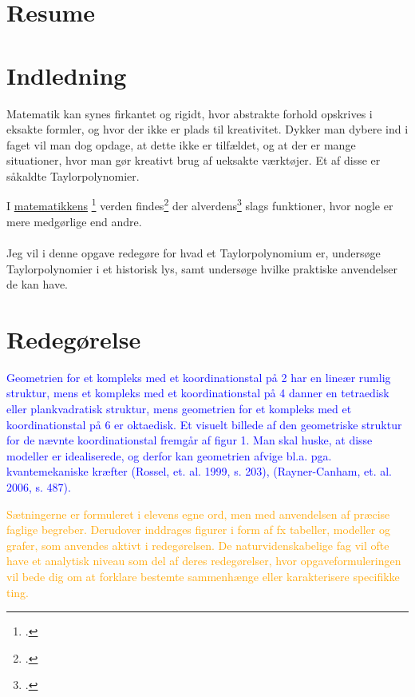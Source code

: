 \documentclass[12pt, a4paper]{article}
\begin{document}
\section*{Resume} %
\blindtext[1-2]
\tableofcontents
\newpage



\section{Indledning} %
Matematik kan synes firkantet og rigidt, hvor abstrakte forhold opskrives i eksakte formler, og hvor der ikke er plads til kreativitet. 
Dykker man dybere ind i faget vil man dog opdage, at dette ikke er tilfældet, og at der er mange situationer, hvor man gør kreativt brug af ueksakte værktøjer. Et af disse er såkaldte Taylorpolynomier.


I \underline{matematikkens} \footcite[s. 23]{alsholm1} verden findes\footcite[s. 22]{alsholm1} der alverdens\footcite{calculuswithanalyticgeometry} slags funktioner, hvor nogle er mere medgørlige end andre.\\
\\
Jeg vil i denne opgave redegøre for hvad et Taylorpolynomium er, undersøge Taylorpolynomier i et historisk lys, samt undersøge hvilke praktiske anvendelser de kan have.

\section{Redegørelse} %
\textcolor{blue}{Geometrien for et kompleks med et koordinationstal på 2 har en lineær rumlig struktur, mens et kompleks med et koordinationstal på 4 danner en tetraedisk eller plankvadratisk struktur, mens geometrien for et kompleks med et koordinationstal på 6 er oktaedisk. Et visuelt billede af den geometriske struktur for de nævnte koordinationstal fremgår af figur 1. Man skal huske, at disse modeller er idealiserede, og derfor kan geometrien afvige bl.a. pga. kvantemekaniske kræfter (Rossel, et. al. 1999, s. 203), (Rayner-Canham, et. al. 2006, s. 487).}

\textcolor{orange}{Sætningerne er formuleret i elevens egne ord, men med anvendelsen af præcise faglige begreber. Derudover inddrages figurer i form af fx tabeller, modeller og grafer, som anvendes aktivt i redegørelsen.
    De naturvidenskabelige fag vil ofte have et analytisk niveau som del af deres redegørelser, hvor opgaveformuleringen vil bede dig om at forklare bestemte sammenhænge eller karakterisere specifikke ting.}
\end{document}
